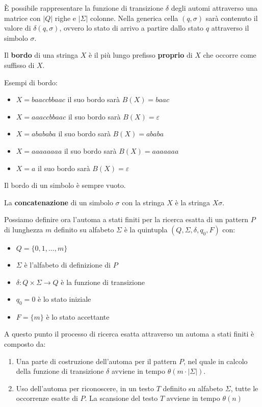 È possibile rappresentare la funzione di transizione $\delta$ degli automi attraverso
una matrice con $|Q|$ righe e $|\Sigma|$ colonne. Nella generica cella $(q, \sigma)$
sarà contenuto il valore di $\delta(q, \sigma)$, ovvero lo stato di arrivo a partire
dallo stato $q$ attraverso il simbolo $\sigma$.
\begin{definizione}
    Il \textbf{bordo} di una stringa $X$ è il più lungo prefisso \textbf{proprio} di $X$ che occorre come suffisso di $X$.
\end{definizione}
\begin{esempio}
    Esempi di bordo:
    \begin{itemize}
        \item $X = baaccbbaac$ il suo bordo sarà $B(X) = baac$
        \item $X = aaaccbbaac$ il suo bordo sarà $B(X) = \varepsilon$
        \item $X = abababa$ il suo bordo sarà $B(X) = ababa$
        \item $X = aaaaaaaa$ il suo bordo sarà $B(X) = aaaaaaa$
        \item $X = a$ il suo bordo sarà $B(X) = \varepsilon$
    \end{itemize}
\end{esempio}
\begin{nota}
    Il bordo di un simbolo è sempre vuoto.
\end{nota}
\begin{definizione}
    La \textbf{concatenazione} di un simbolo $\sigma$ con la stringa $X$ è la
    stringa $X\sigma$.
\end{definizione}
Possiamo definire ora l'automa a stati finiti per la ricerca esatta di un pattern
$P$ di lunghezza $m$ definito su alfabeto $\Sigma$ è la quintupla $(Q, \Sigma, \delta, q_0, F)$ con:
\begin{itemize}
    \item $Q = \{0, 1, \dots, m\}$
    \item $\Sigma$ è l'alfabeto di definizione di $P$
    \item $\delta: Q \times \Sigma \to Q$ è la funzione di transizione
    \item $q_0 = 0$ è lo stato iniziale
    \item $F = \{m\}$ è lo stato accettante
\end{itemize}
A questo punto il processo di ricerca esatta attraverso un automa a stati finiti
è composto da:
\begin{enumerate}
    \item Una parte di costruzione dell'automa per il pattern $P$, nel quale in
          calcolo della funzione di transizione $\delta$ avviene in tempo $\theta(m \cdot |\Sigma|)$.
    \item Uso dell'automa per riconoscere, in un testo $T$ definito su alfabeto
          $\Sigma$, tutte le occorrenze esatte di $P$. La scansione del testo $T$
          avviene in tempo $\theta(n)$
\end{enumerate}
